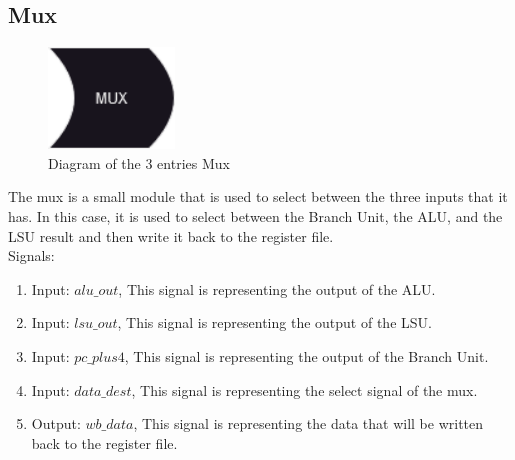 \subsection{Mux}

\begin{figure}[H]
\centering
\includegraphics[width=0.30\textwidth]{../diagrams/writeback/mux.png}
\caption{Diagram of the 3 entries Mux}
\label{fig:mux3}
\end{figure}

The mux is a small module that is used to select between the three inputs that it has. In this case, it is used to select
between the Branch Unit, the ALU, and the LSU result and then write it back to the register file. \\

Signals:
\begin{enumerate}[label={\textbullet}]
    \item Input: $alu\_out$, This signal is representing the output of the ALU.
    \item Input: $lsu\_out$, This signal is representing the output of the LSU.
    \item Input: $pc\_plus4$, This signal is representing the output of the Branch Unit.
    \item Input: $data\_dest$, This signal is representing the select signal of the mux.
    \item Output: $wb\_data$, This signal is representing the data that will be written back to the register file.
\end{enumerate}


